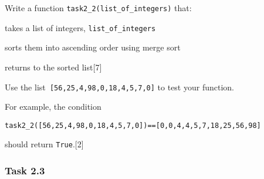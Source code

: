 \begin{onehalfspace}
\noindent Write a function \texttt{task2\_2(list\_of\_integers)} that:
\end{onehalfspace}
\begin{itemize}
\begin{onehalfspace}
\item takes a list of integers, \texttt{list\_of\_integers}
\item sorts them into ascending order using merge sort
\item returns to the sorted list\hfill{}{[}7{]}
\end{onehalfspace}
\end{itemize}
\begin{onehalfspace}
\noindent Use the list\texttt{ {[}56,25,4,98,0,18,4,5,7,0{]}} to test
your function.

\noindent For example, the condition

\noindent \texttt{task2\_2({[}56,25,4,98,0,18,4,5,7,0{]})=={[}0,0,4,4,5,7,18,25,56,98{]}}

\noindent should return \texttt{True}.\hfill{}{[}2{]}
\end{onehalfspace}
\begin{onehalfspace}

\subsubsection*{Task 2.3}
\end{onehalfspace}

